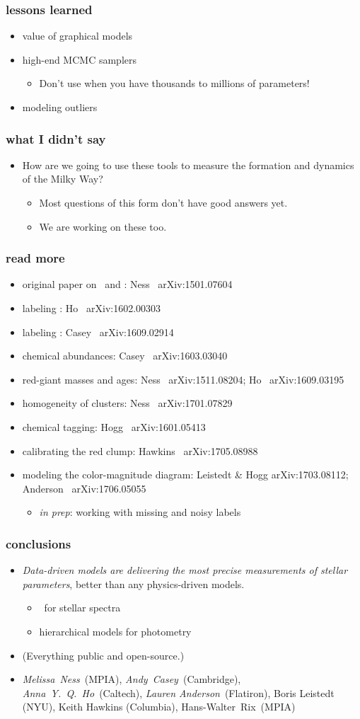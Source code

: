 \documentclass[pdftex]{beamer}
\newcommand{\conclusions}{%
\begin{frame}
  \frametitle{conclusions}
  \begin{itemize}
  \item \emph{Data-driven models are delivering the most precise measurements
    of stellar parameters}, better than any physics-driven models.
    \begin{itemize}
    \item \tc\ for stellar spectra
    \item hierarchical models for photometry
    \end{itemize}
  \item (Everything public and open-source.)
  \item \emph{Melissa~Ness}~(MPIA), \emph{Andy~Casey}~(Cambridge), \emph{Anna~Y.~Q.~Ho}~(Caltech), \emph{Lauren Anderson}~(Flatiron), Boris Leistedt (NYU), Keith Hawkins (Columbia), Hans-Walter~Rix~(MPIA)
  \end{itemize}
\end{frame}}
\begin{document}
\begin{frame}
  \frametitle{lessons learned}
  \begin{itemize}
  \item value of graphical models
  \item high-end MCMC samplers
    \begin{itemize}
    \item Don't use  when you have thousands to millions of parameters!
    \end{itemize}
  \item modeling outliers
  \end{itemize}
\end{frame}

\begin{frame}
  \frametitle{what I didn't say}
  \begin{itemize}
  \item How are we going to use these tools to measure the formation
    and dynamics of the Milky Way?
    \begin{itemize}
    \item Most questions of this form don't have good answers yet.
    \item We are working on these too.
    \end{itemize}
  \end{itemize}
\end{frame}

\begin{frame}
  \frametitle{read more}
  \begin{itemize}
  \item original paper on \tc\ and \apogee: Ness \etal\ arXiv:1501.07604
  \item labeling \lamost: Ho \etal\ arXiv:1602.00303
  \item labeling : Casey \etal\ arXiv:1609.02914
  \item chemical abundances: Casey \etal\ arXiv:1603.03040
  \item red-giant masses and ages: Ness \etal\ arXiv:1511.08204; Ho \etal\ arXiv:1609.03195
  \item homogeneity of clusters: Ness \etal\ arXiv:1701.07829
  \item chemical tagging: Hogg \etal\ arXiv:1601.05413
  \item calibrating the red clump: Hawkins \etal\ arXiv:1705.08988
  \item modeling the color-magnitude diagram: Leistedt \& Hogg arXiv:1703.08112; Anderson \etal\ arXiv:1706.05055
    \begin{itemize}
    \item \textsl{in prep}: working with missing and noisy labels
    \end{itemize}
  \end{itemize}
\end{frame}

\conclusions
\end{document}
